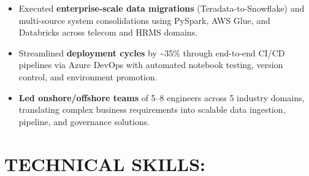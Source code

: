 \documentclass[a4paper,10pt]{article}
\begin{document}
\begin{itemize}
    \item Executed \textbf{enterprise-scale data migrations} (Teradata-to-Snowflake) and multi-source system consolidations using PySpark, AWS Glue, and Databricks across telecom and HRMS domains.
    \item Streamlined \textbf{deployment cycles} by \textasciitilde 35\% through end-to-end CI/CD pipelines via Azure DevOps with automated notebook testing, version control, and environment promotion.
    \item \textbf{Led onshore/offshore teams} of 5--8 engineers across 5 industry domains, translating complex business requirements into scalable data ingestion, pipeline, and governance solutions.
\end{itemize}

\section*{TECHNICAL SKILLS:}
\renewcommand{\arraystretch}{1.15}
\end{document}
